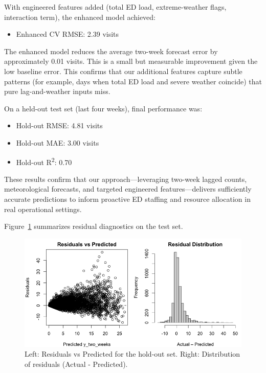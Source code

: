 \documentclass[11pt]{article}
\begin{document}
With engineered features added (total ED load, extreme-weather flags, interaction term), the enhanced model achieved:
\begin{itemize}[nosep]
  \item Enhanced CV RMSE: 2.39 visits
\end{itemize}

\noindent The enhanced model reduces the average two-week forecast error by approximately 0.01 visits. This is a small but measurable improvement given the low baseline error.  This confirms that our additional features capture subtle patterns (for example, days when total ED load and severe weather coincide) that pure lag-and-weather inputs miss.

On a held-out test set (last four weeks), final performance was:
\begin{itemize}[nosep]
  \item Hold-out RMSE: 4.81 visits
  \item Hold-out MAE: 3.00 visits
  \item Hold-out R\textsuperscript{2}: 0.70
\end{itemize}

\noindent These results confirm that our approach—leveraging two-week lagged counts, meteorological forecasts, and targeted engineered features—delivers sufficiently accurate predictions to inform proactive ED staffing and resource allocation in real operational settings.  

Figure~\ref{fig:holdout_residuals} summarizes residual diagnostics on the test set.

\begin{figure}[H]
  \centering
  \includegraphics[width=\textwidth]{holdout_residuals.png}
  \caption{Left: Residuals vs Predicted for the hold-out set. Right: Distribution of residuals (Actual - Predicted).}
  \label{fig:holdout_residuals}
\end{figure}
\end{document}
